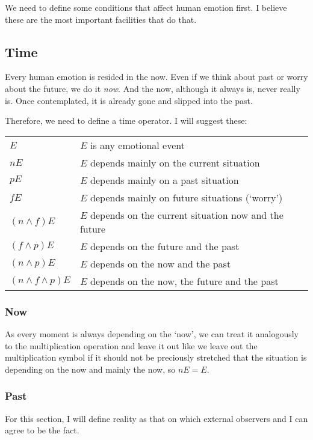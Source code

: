 \documentclass{scrartcl}
\begin{document}
We need to define some conditions that affect human emotion first. I believe these are the most important facilities that
do that.

\subsection{Time}

Every human emotion is resided in the now. Even if we think about past or worry about the future, we do it \textit{now}.
And the now, although it always is, never really is. Once contemplated, it is already gone and slipped into the past.

Therefore, we need to define a time operator. I will suggest these:

\begin{tabular}{l|l}
	$E$           & $E$ is any emotional event \\
	$n E$ & $E$ depends mainly on the current situation \\
	$p E$ & $E$ depends mainly on a past situation \\
	$f E$ & $E$ depends mainly on future situations (`worry') \\
	$(n \wedge f) E$ & $E$ depends on the current situation now and the future \\
	$(f \wedge p) E$ & $E$ depends on the future and the past \\
	$(n \wedge p) E$ & $E$ depends on the now and the past \\
	$(n \wedge f \wedge p) E$ & $E$ depends on the now, the future and the past
\end{tabular}

\subsubsection{Now}

As every moment is always depending on the `now', we can treat it analogously to the multiplication operation 
and leave it out like we leave out the multiplication symbol if it should not be preciously stretched that the
situation is depending on the now and mainly the now, so $n E = E$.

\subsubsection{Past}

For this section, I will define reality as that on which external observers and I can agree to be the fact.
\end{document}
